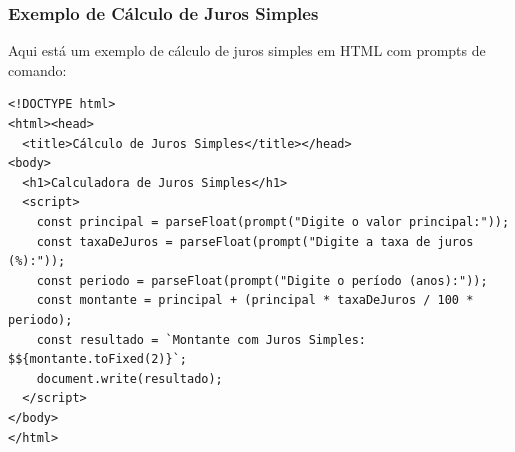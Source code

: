 \documentclass[13pt, xcolor={dvipsnames,svgnames}, portuguese]{beamer}
\begin{document}
\begin{frame}[fragile]
\frametitle{Exemplo de Cálculo de Juros Simples}
Aqui está um exemplo de cálculo de juros simples em HTML com prompts de comando:

\begin{verbatim}
<!DOCTYPE html>
<html><head>
  <title>Cálculo de Juros Simples</title></head>
<body>
  <h1>Calculadora de Juros Simples</h1>
  <script>
    const principal = parseFloat(prompt("Digite o valor principal:"));
    const taxaDeJuros = parseFloat(prompt("Digite a taxa de juros (%):"));
    const periodo = parseFloat(prompt("Digite o período (anos):"));
    const montante = principal + (principal * taxaDeJuros / 100 * periodo);
    const resultado = `Montante com Juros Simples: $${montante.toFixed(2)}`;
    document.write(resultado);
  </script>
</body>
</html>
\end{verbatim}

\end{frame}







\end{document}
